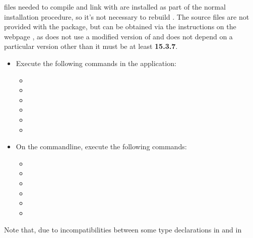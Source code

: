 files needed to compile and link with \textbf{\ECL} are installed as part of the normal
\mplusm{} installation procedure, so it's not necessary to rebuild \textbf{\ECL}.
The source files are not provided with the  package, but can be obtained
via the instructions on the web\longDash{}page
, as
\mplusm{} does not use a modified version of \textbf{\ECL} and does not depend on a
particular version \longDash{} other than it must be at least \textbf{15.3.7}.
\begin{itemize}
\item Execute the following commands in the  application:
\begin{itemize}
\item {}
\item\exSp{}
\item\exSp{}
\item\exSp{}
\item\exSp{}
\item\exSp{}
\end{itemize}
\item\exSp{}On the command\longDash{}line, execute the following commands:
\begin{itemize}
\item {}
\item\exSp{}
\item\exSp{}
\item\exSp{}
\item\exSp{}
\item\exSp{}
\end{itemize}
\end{itemize}
\tertiaryEnd
{}
Note that, due to incompatibilities between some type declarations in \textbf{\ECL} and in
